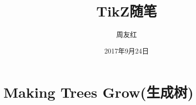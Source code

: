 \documentclass[UTF8]{ctexbook}
\title{TikZ随笔}
\author{周友红}
\date{2017年9月24日}
\begin{document}
\maketitle
\tableofcontents
% 
\chapter{Making Trees Grow(生成树)}

\end{document}
